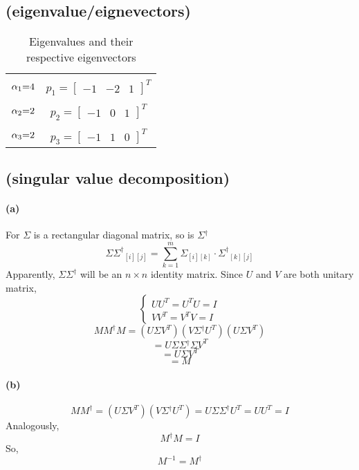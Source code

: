 \documentclass[a4paper]{exam}
\begin{document}
 \subsection{(eigenvalue/eignevectors)}
\begin{table}[htbp]
\centering
\caption{Eigenvalues and their respective eigenvectors}
 \begin{tabular}{c|c}
 	\hline\\
 	${\alpha _1}{\rm{ = }}4$ & ${p_1} = {[\begin{array}{*{20}{c}}
 		{ - 1}&{ - 2}&1
 		\end{array}]^T}$\\
 	\hline\\
 	 ${\alpha _2}{\rm{ = }}2$ & ${p_2} = {[\begin{array}{*{20}{c}}
 	 		{ - 1}&0&1
 	 		\end{array}]^T}$\\
 	\hline\\
 	${\alpha _3}{\rm{ = }}2$ & ${p_3} = {[\begin{array}{*{20}{c}}
 		{ - 1}&1&0\end{array}]^T}$\\
 	\hline
 \end{tabular}
\end{table}
\subsection{(singular value decomposition)}
\paragraph{(a)}
 	  	For $\Sigma$ is a rectangular diagonal matrix, so is ${{\Sigma }}{^\dag }$
 \[{{\Sigma }}{{{\Sigma }}^\dag }_{[i][j]} = \sum\limits_{k = 1}^m {{{{\Sigma }}_{[i][k]}} \cdot {{{\Sigma }}^\dag }_{[k][j]}} \]
\indent  	Apparently, ${{\Sigma }}{{{\Sigma }}^\dag }$ will be an $n \times n$ identity matrix. Since $U$ and $V$ are both unitary matrix,
 	\[\left\{ {\begin{array}{*{20}{c}}
 		{U{U^T} = {U^T}U = I}\\
 		{V{V^T} = {V^T}V = I}
 		\end{array}} \right.\]
 	\[M{M^\dag }M = (U{{\Sigma }}{V^T})(V{{\Sigma }}{^\dag }{U^T})(U{{\Sigma }}{V^T})\]
 	\[ = U{{\Sigma }}{{\Sigma }}{^\dag }{{\Sigma }}{V^T}\]
 	\[ = U{{\Sigma }}{V^T}\]
 	\[ = M\]
\paragraph{(b)}
   \[M{M^\dag } = (U\Sigma {V^T})(V\Sigma {^\dag }{U^T}) = U\Sigma {\Sigma ^\dag }{U^T} = U{U^T} = I\]
   Analogously,\[{M^\dag }M = I\]
   So,
   \[{M^{ - 1}} = {M^\dag }\]
\end{document}
